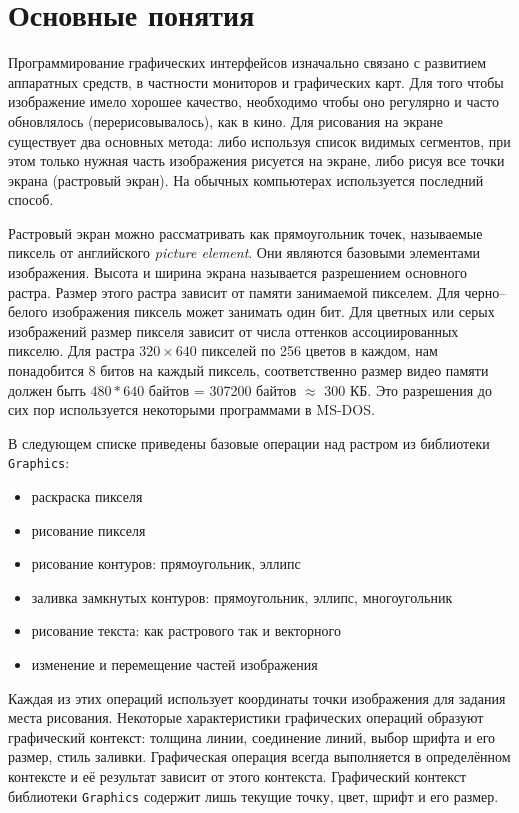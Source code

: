 \section{Основные понятия}
\label{sec:basic_notions}

Программирование графических интерфейсов изначально связано с развитием
аппаратных средств, в частности мониторов и графических карт. Для того чтобы
изображение имело хорошее качество, необходимо чтобы оно регулярно и часто
обновлялось (перерисовывалось), как в кино. Для рисования на экране существует
два основных метода: либо используя список видимых сегментов, при этом только
нужная часть изображения рисуется на экране, либо рисуя все точки экрана 
(растровый экран). На обычных компьютерах используется последний способ.

Растровый экран можно рассматривать как прямоугольник точек, называемые пиксель 
от английского {\it picture element}. Они являются базовыми элементами 
изображения. Высота и ширина экрана называется разрешением основного растра. 
Размер этого растра зависит от памяти занимаемой пикселем. Для черно--белого 
изображения пиксель может занимать один бит. Для цветных или серых изображений 
размер пикселя зависит от числа оттенков ассоциированных пикселю. Для растра 
$320 \times 640$ пикселей по 256 цветов в каждом, нам понадобится 8 битов на 
каждый пиксель, соответственно размер видео памяти должен быть $480 * 640$ 
байтов = 307200 байтов $\approx$ 300 КБ. Это разрешения до сих пор используется 
некоторыми программами в MS-DOS.

В следующем списке приведены базовые операции над растром из библиотеки
\texttt{Graphics}:

\begin{itemize}
	\item раскраска пикселя
	
	\item рисование пикселя
	
	\item рисование контуров: прямоугольник, эллипс
	
	\item заливка замкнутых контуров: прямоугольник, эллипс, многоугольник
	
	\item рисование текста: как растрового так и векторного
	
	\item изменение и перемещение частей изображения 
\end{itemize}

Каждая из этих операций использует координаты точки изображения для задания
места рисования. Некоторые характеристики графических операций образуют
графический контекст: толщина линии, соединение линий, выбор шрифта и его
размер, стиль заливки. Графическая операция всегда выполняется в определённом
контексте и её результат зависит от этого контекста. Графический контекст
библиотеки \texttt{Graphics} содержит лишь текущие точку, цвет, шрифт и его
размер.